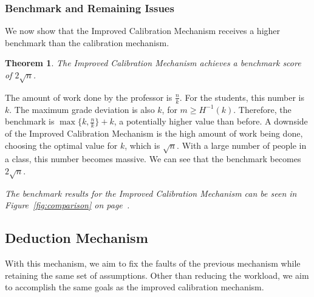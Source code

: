 \documentclass[12pt, Arial]{article}
\newtheorem{theorem}{Theorem}
\begin{document}
\subsubsection{Benchmark and Remaining Issues}
We now show that the Improved Calibration Mechanism receives a higher benchmark than the calibration mechanism.\\
\begin{theorem}
The Improved Calibration Mechanism achieves a benchmark score of $2\sqrt{n}$.
\end{theorem}
The amount of work done by the professor is $\frac{n}{k}$. For the students, this number is $k$. The maximum grade deviation is also $k$, for $m \geq H^{-1}(k)$. Therefore, the benchmark is $\max\{k, \frac{n}{k}\} + k$, a potentially higher value than before. A downside of the Improved Calibration Mechanism is the high amount of work being done, choosing the optimal value for $k$, which is $\sqrt{n}$. With a large number of people in a class, this number becomes massive. We can see that the benchmark becomes $2\sqrt{n}$.

\emph{The benchmark results for the Improved Calibration Mechanism can be seen in Figure~\ref{fig:comparison} on page~\pageref{fig:comparison}.}
\subsection{Deduction Mechanism}
\label{sec:deduction}
With this mechanism, we aim to fix the faults of the previous mechanism while retaining the same set of assumptions. Other than reducing the workload, we aim to accomplish the same goals as the improved calibration mechanism.
\end{document}
